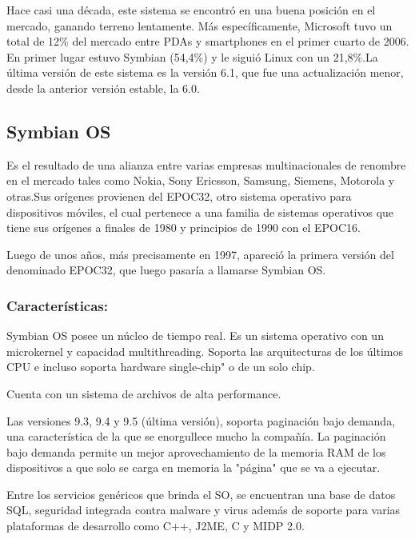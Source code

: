 Hace casi una década, este sistema se encontró en una buena posición en el mercado, ganando terreno lentamente. Más específicamente, Microsoft tuvo un total de 12\% del mercado 
entre PDAs y smartphones en el primer cuarto de 2006. En primer lugar estuvo Symbian (54,4\%) y le siguió Linux con un 21,8\%.La última versión de este sistema es la versión 6.1, 
que fue una actualización menor, desde la anterior versión estable, la 6.0.           


\subsection*{Symbian OS}
Es el resultado de una alianza entre varias empresas multinacionales de renombre en el mercado tales como Nokia, Sony Ericsson, Samsung, Siemens, Motorola y otras.Sus 
orígenes provienen del EPOC32, otro sistema operativo para dispositivos móviles, el cual pertenece a una familia de sistemas operativos que tiene sus orígenes a finales de 
1980 y principios de 1990 con el EPOC16.

Luego de unos años, más precisamente en 1997, apareció la primera versión del denominado EPOC32, que luego pasaría a llamarse Symbian OS.

\subsubsection*{Características:}
Symbian OS posee un núcleo de tiempo real. 
Es un sistema operativo con un microkernel y capacidad multithreading. 
Soporta las arquitecturas de los últimos CPU e incluso soporta hardware single-chip" o de un solo chip.                                                                                                                    

Cuenta con un sistema de archivos de alta performance.                                                                                                          

Las versiones 9.3, 9.4 y 9.5 (última versión), soporta paginación bajo demanda, una característica de la que se enorgullece mucho la compañía. La paginación bajo demanda permite 
un mejor aprovechamiento de la memoria RAM de los dispositivos a que solo se carga en memoria la "página" que se va a ejecutar.                                                                                                                   

Entre los servicios genéricos que brinda el SO, se encuentran una base de datos SQL, seguridad integrada contra malware y virus además de soporte para varias plataformas de 
desarrollo como C++, J2ME, C y MIDP 2.0.                                                                                                                   

